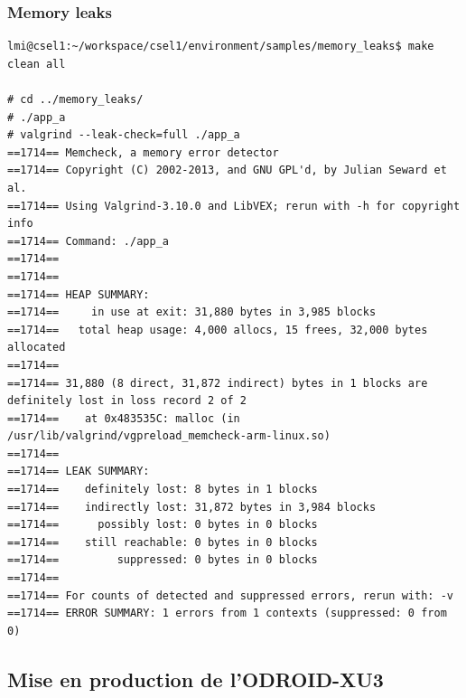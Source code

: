 \subsubsection{Memory leaks}
\begin{lstlisting}
lmi@csel1:~/workspace/csel1/environment/samples/memory_leaks$ make clean all

# cd ../memory_leaks/
# ./app_a 
# valgrind --leak-check=full ./app_a
==1714== Memcheck, a memory error detector
==1714== Copyright (C) 2002-2013, and GNU GPL'd, by Julian Seward et al.
==1714== Using Valgrind-3.10.0 and LibVEX; rerun with -h for copyright info
==1714== Command: ./app_a
==1714== 
==1714== 
==1714== HEAP SUMMARY:
==1714==     in use at exit: 31,880 bytes in 3,985 blocks
==1714==   total heap usage: 4,000 allocs, 15 frees, 32,000 bytes allocated
==1714== 
==1714== 31,880 (8 direct, 31,872 indirect) bytes in 1 blocks are definitely lost in loss record 2 of 2
==1714==    at 0x483535C: malloc (in /usr/lib/valgrind/vgpreload_memcheck-arm-linux.so)
==1714== 
==1714== LEAK SUMMARY:
==1714==    definitely lost: 8 bytes in 1 blocks
==1714==    indirectly lost: 31,872 bytes in 3,984 blocks
==1714==      possibly lost: 0 bytes in 0 blocks
==1714==    still reachable: 0 bytes in 0 blocks
==1714==         suppressed: 0 bytes in 0 blocks
==1714== 
==1714== For counts of detected and suppressed errors, rerun with: -v
==1714== ERROR SUMMARY: 1 errors from 1 contexts (suppressed: 0 from 0)
\end{lstlisting}

\subsection{Mise en production de l'ODROID-XU3}

